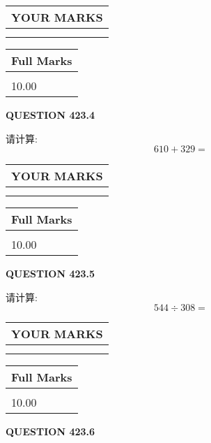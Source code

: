 \documentclass{ctexart}
\begin{document}
\vspace{0.2in}
  
\noindent\begin{tabular}{|l|}
\hline
 YOUR MARKS  \\
\hline
 \\ 
 \\ 
\hline
\end{tabular}
\hspace{0.05in} \begin{tabular}{|l|}
\hline
 Full Marks  \\
\hline
 \\ 
10.00 \\
\hline
\end{tabular}
{\textbf{\Large{QUESTION
423.4 
}}}
  
  
 
请计算:
\begin{equation}
610 +  %
329 = \nonumber
\end{equation}
 

 

 
  
\vspace{0.2in}
  
\noindent\begin{tabular}{|l|}
\hline
 YOUR MARKS  \\
\hline
 \\ 
 \\ 
\hline
\end{tabular}
\hspace{0.05in} \begin{tabular}{|l|}
\hline
 Full Marks  \\
\hline
 \\ 
10.00 \\
\hline
\end{tabular}
{\textbf{\Large{QUESTION
423.5 
}}}
  
  
 
请计算:
\begin{equation}
544  \div    %
308 = \nonumber
\end{equation}
 

 

 
  
\vspace{0.2in}
  
\noindent\begin{tabular}{|l|}
\hline
 YOUR MARKS  \\
\hline
 \\ 
 \\ 
\hline
\end{tabular}
\hspace{0.05in} \begin{tabular}{|l|}
\hline
 Full Marks  \\
\hline
 \\ 
10.00 \\
\hline
\end{tabular}
{\textbf{\Large{QUESTION
423.6 
}}}
  
\end{document}

